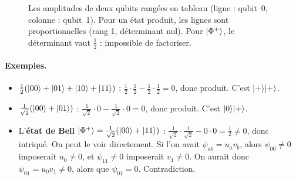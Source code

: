 \begin{figure}[htbp]
\centering
{}
\caption{Les amplitudes de deux qubits rangées en tableau (ligne : qubit~0, colonne : qubit~1). Pour un état produit, les lignes sont proportionnelles (rang 1, déterminant nul). Pour $\lvert \Phi^+\rangle$, le déterminant vaut $\tfrac12$ : impossible de factoriser.}\label{fig:tableau-amplitudes}
\end{figure}

\paragraph{Exemples.}
\begin{itemize}
\item $\tfrac12(\lvert 00\rangle+\lvert 01\rangle+\lvert 10\rangle+\lvert 11\rangle)$ : $\tfrac12\cdot\tfrac12-\tfrac12\cdot\tfrac12=0$, donc produit. C'est $\lvert +\rangle\lvert +\rangle$.
\item $\tfrac1{\sqrt2}(\lvert 00\rangle+\lvert 01\rangle)$ : $\tfrac1{\sqrt2}\cdot0-\tfrac1{\sqrt2}\cdot0=0$, donc produit. C'est $\lvert 0\rangle\lvert +\rangle$.
\item L'\textbf{état de Bell} $\lvert \Phi^+\rangle=\tfrac1{\sqrt2}(\lvert 00\rangle+\lvert 11\rangle)$ : $\tfrac1{\sqrt2}\cdot\tfrac1{\sqrt2}-0\cdot0=\tfrac12\neq0$, donc intriqué. On peut le voir directement. Si l'on avait $\psi_{ab}=u_av_b$, alors $\psi_{00}\neq0$ imposerait $u_0\neq0$, et $\psi_{11}\neq0$ imposerait $v_1\neq0$. On aurait donc $\psi_{01}=u_0v_1\neq0$, alors que $\psi_{01}=0$. Contradiction.
\end{itemize}

